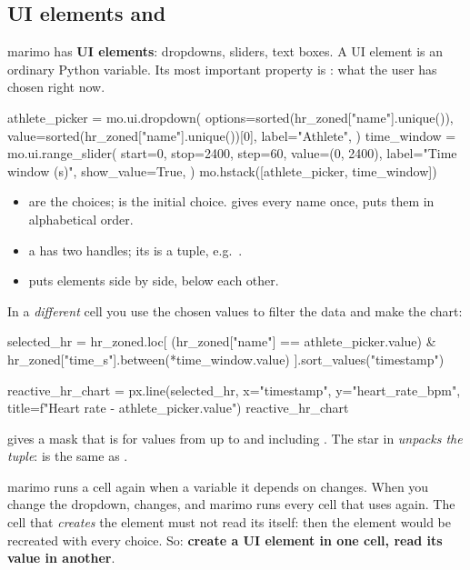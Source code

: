 \documentclass[11pt,a4paper]{article}
\begin{document}
\subsection{UI elements and }

marimo has \textbf{UI elements}: dropdowns, sliders, text boxes. A UI
element is an ordinary Python variable. Its most important property is
: what the user has chosen right now.

\begin{python}[noeval]
athlete_picker = mo.ui.dropdown(
    options=sorted(hr_zoned["name"].unique()),
    value=sorted(hr_zoned["name"].unique())[0],
    label="Athlete",
)
time_window = mo.ui.range_slider(
    start=0, stop=2400, step=60, value=(0, 2400),
    label="Time window (s)", show_value=True,
)
mo.hstack([athlete_picker, time_window])
\end{python}

\begin{itemize}
  \item {} are the choices;  is the initial
        choice.  gives every name once, 
        puts them in alphabetical order.
  \item a  has two handles; its  is a
        tuple, e.g.\ .
  \item {} puts elements side by side,
         below each other.
\end{itemize}

In a \emph{different} cell you use the chosen values to filter the data
and make the chart:

\begin{python}[noeval]
selected_hr = hr_zoned.loc[
    (hr_zoned["name"] == athlete_picker.value)
    & hr_zoned["time_s"].between(*time_window.value)
].sort_values("timestamp")

reactive_hr_chart = px.line(selected_hr, x="timestamp", y="heart_rate_bpm",
                            title=f"Heart rate - {athlete_picker.value}")
reactive_hr_chart
\end{python}

 gives a mask that is  for values from
 up to and including . The star in
 \emph{unpacks the tuple}:
 is the same as .

\begin{keyidea}
marimo runs a cell again when a variable it depends on changes. When you
change the dropdown,  changes, and marimo
runs every cell that uses  again. The cell that
\emph{creates} the element must not read its  itself: then
the element would be recreated with every choice. So: \textbf{create a
UI element in one cell, read its value in another}.
\end{keyidea}
\end{document}
